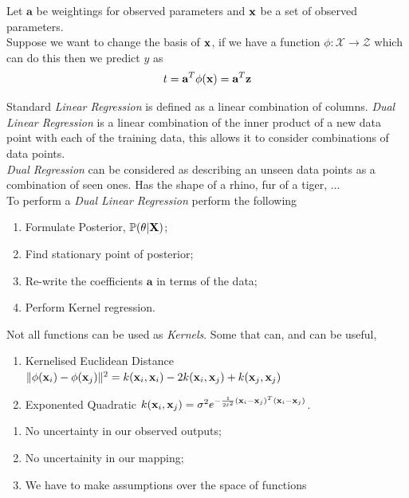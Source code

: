 \documentclass[11pt,a4paper]{article}
\begin{document}
Let $\textbf{a}$ be weightings for observed parameters and $\textbf{x}$ be a set of observed parameters.\\
Suppose we want to change the basis of $\textbf{x}$, if we have a function $\phi:\mathcal{X}\to\mathcal{Z}$ which can do this then we predict $y$ as
$$t=\textbf{a}^T\phi(\textbf{x})=\textbf{a}^T\textbf{z}$$

Standard \textit{Linear Regression} is defined as a linear combination of columns. \textit{Dual Linear Regression} is a linear combination of the inner product of a new data point with each of the training data, this allows it to consider combinations of data points.\\

\textit{Dual Regression} can be considered as describing an unseen data points as a combination of seen ones. \ie Has the shape of a rhino, fur of a tiger, ...\\

To perform a \textit{Dual Linear Regression} perform the following
\begin{enumerate}[label=\roman*)]
	\item Formulate Posterior, $\mathbb{P}(\theta|\textbf{X})$;
	\item Find stationary point of posterior;
	\item Re-write the coefficients $\textbf{a}$ in terms of the data;
	\item Perform Kernel regression.
\end{enumerate}

Not all functions can be used as \textit{Kernels}. Some that can, and can be useful,
\begin{enumerate}[label=\roman*)]
	\item Kernelised Euclidean Distance $\|\phi(\textbf{x}_i)-\phi(\textbf{x}_j)\|^2=k(\textbf{x}_i,\textbf{x}_i)-2k(\textbf{x}_i,\textbf{x}_j)+k(\textbf{x}_j,\textbf{x}_j)$
	\item Exponented Quadratic $k(\textbf{x}_i,\textbf{x}_j)=\sigma^2 e^{-\frac{1}{2\ell^2}(\textbf{x}_i-\textbf{x}_j)^T(\textbf{x}_i-\textbf{x}_j)}$.
\end{enumerate}

\begin{enumerate}[label=\roman*)]
	\item No uncertainty in our observed outputs;
	\item No uncertainity in our mapping;
	\item We have to make assumptions over the space of functions
\end{enumerate}
\end{document}
